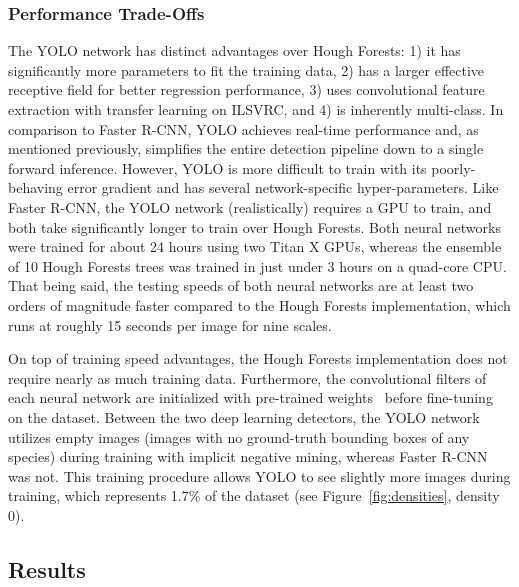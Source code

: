 \subsubsection{Performance Trade-Offs}

The YOLO network has distinct advantages over Hough Forests: 1) it has significantly more parameters to fit the training data, 2) has a larger effective receptive field for better regression performance, 3) uses convolutional feature extraction with transfer learning on ILSVRC, and 4) is inherently multi-class.  In comparison to Faster R-CNN, YOLO achieves real-time performance and, as mentioned previously, simplifies the entire detection pipeline down to a single forward inference.  However, YOLO is more difficult to train with its poorly-behaving error gradient and has several network-specific hyper-parameters.  Like Faster R-CNN, the YOLO network (realistically) requires a GPU to train, and both take significantly longer to train over Hough Forests.  Both neural networks were trained for about 24 hours using two Titan X GPUs, whereas the ensemble of 10 Hough Forests trees was trained in just under 3 hours on a quad-core CPU.  That being said, the testing speeds of both neural networks are at least two orders of magnitude faster compared to the Hough Forests implementation, which runs at roughly 15 seconds per image for nine scales.

On top of training speed advantages, the Hough Forests implementation does not require nearly as much training data.  Furthermore, the convolutional filters of each neural network are initialized with pre-trained weights~\cite{oquab_learning_2014} before fine-tuning on the dataset.  Between the two deep learning detectors, the YOLO network utilizes empty images (images with no ground-truth bounding boxes of any species) during training with implicit negative mining, whereas Faster R-CNN was not.  This training procedure allows YOLO to see slightly more images during training, which represents 1.7\% of the dataset (see Figure~\ref{fig:densities}, density 0).

\subsection{Results}


